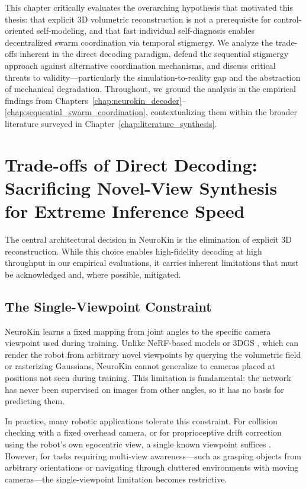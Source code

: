 \documentclass[12pt,a4paper,oneside]{report}
\begin{document}
This chapter critically evaluates the overarching hypothesis that motivated this thesis: that explicit 3D volumetric reconstruction is not a prerequisite for control-oriented self-modeling, and that fast individual self-diagnosis enables decentralized swarm coordination via temporal stigmergy. We analyze the trade-offs inherent in the direct decoding paradigm, defend the sequential stigmergy approach against alternative coordination mechanisms, and discuss critical threats to validity—particularly the simulation-to-reality gap and the abstraction of mechanical degradation. Throughout, we ground the analysis in the empirical findings from Chapters~\ref{chap:neurokin_decoder}--\ref{chap:sequential_swarm_coordination}, contextualizing them within the broader literature surveyed in Chapter~\ref{chap:literature_synthesis}.

\section{Trade-offs of Direct Decoding: Sacrificing Novel-View Synthesis for Extreme Inference Speed}

The central architectural decision in NeuroKin is the elimination of explicit 3D reconstruction. While this choice enables high-fidelity decoding at high throughput in our empirical evaluations, it carries inherent limitations that must be acknowledged and, where possible, mitigated.

\subsection{The Single-Viewpoint Constraint}
\label{subsec:the_single_viewpoint_constraint}

NeuroKin learns a fixed mapping from joint angles to the specific camera viewpoint used during training. Unlike NeRF-based models \cite{mildenhall2020nerf} or 3DGS \cite{kerbl20233d}, which can render the robot from arbitrary novel viewpoints by querying the volumetric field or rasterizing Gaussians, NeuroKin cannot generalize to cameras placed at positions not seen during training. This limitation is fundamental: the network has never been supervised on images from other angles, so it has no basis for predicting them.

In practice, many robotic applications tolerate this constraint. For collision checking with a fixed overhead camera, or for proprioceptive drift correction using the robot's own egocentric view, a single known viewpoint suffices \cite{hu2024teaching, chen2022full}. However, for tasks requiring multi-view awareness—such as grasping objects from arbitrary orientations or navigating through cluttered environments with moving cameras—the single-viewpoint limitation becomes restrictive.
\end{document}
